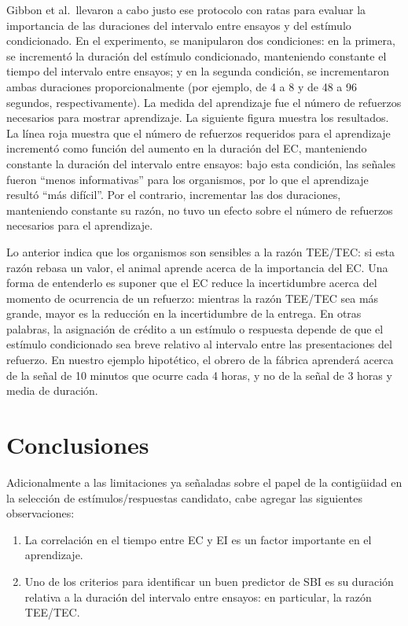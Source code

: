 \documentclass[
  letterpaper,
]{book}
\begin{document}
Gibbon et al.~llevaron a cabo justo ese protocolo con ratas para evaluar
la importancia de las duraciones del intervalo entre ensayos y del
estímulo condicionado. En el experimento, se manipularon dos
condiciones: en la primera, se incrementó la duración del estímulo
condicionado, manteniendo constante el tiempo del intervalo entre
ensayos; y en la segunda condición, se incrementaron ambas duraciones
proporcionalmente (por ejemplo, de 4 a 8 y de 48 a 96 segundos,
respectivamente). La medida del aprendizaje fue el número de refuerzos
necesarios para mostrar aprendizaje. La siguiente figura muestra los
resultados. La línea roja muestra que el número de refuerzos requeridos
para el aprendizaje incrementó como función del aumento en la duración
del EC, manteniendo constante la duración del intervalo entre ensayos:
bajo esta condición, las señales fueron ``menos informativas'' para los
organismos, por lo que el aprendizaje resultó ``más difícil''. Por el
contrario, incrementar las dos duraciones, manteniendo constante su
razón, no tuvo un efecto sobre el número de refuerzos necesarios para el
aprendizaje.

Lo anterior indica que los organismos son sensibles a la razón TEE/TEC:
si esta razón rebasa un valor, el animal aprende acerca de la
importancia del EC. Una forma de entenderlo es suponer que el EC reduce
la incertidumbre acerca del momento de ocurrencia de un refuerzo:
mientras la razón TEE/TEC sea más grande, mayor es la reducción en la
incertidumbre de la entrega. En otras palabras, la asignación de crédito
a un estímulo o respuesta depende de que el estímulo condicionado sea
breve relativo al intervalo entre las presentaciones del refuerzo. En
nuestro ejemplo hipotético, el obrero de la fábrica aprenderá acerca de
la señal de 10 minutos que ocurre cada 4 horas, y no de la señal de 3
horas y media de duración.

\section{Conclusiones}\label{conclusiones-1}

Adicionalmente a las limitaciones ya señaladas sobre el papel de la
contigüidad en la selección de estímulos/respuestas candidato, cabe
agregar las siguientes observaciones:

\begin{enumerate}
\def\labelenumi{\arabic{enumi}.}
\item
  La correlación en el tiempo entre EC y EI es un factor importante en
  el aprendizaje.
\item
  Uno de los criterios para identificar un buen predictor de SBI es su
  duración relativa a la duración del intervalo entre ensayos: en
  particular, la razón TEE/TEC.
\end{enumerate}
\end{document}
